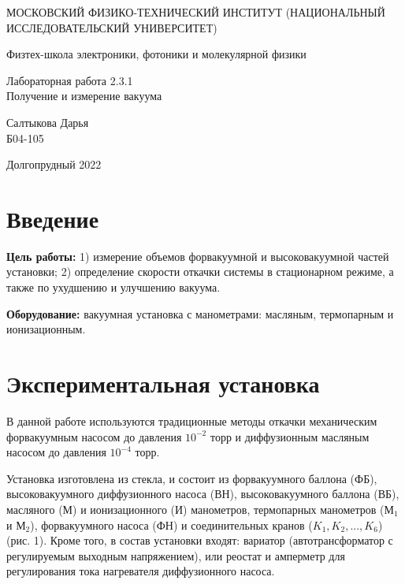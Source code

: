 \documentclass[a4paper,12pt]{article} %
\begin{document}
	
	\begin{titlepage}
	\begin{center}
		{\large МОСКОВСКИЙ ФИЗИКО-ТЕХНИЧЕСКИЙ ИНСТИТУТ (НАЦИОНАЛЬНЫЙ ИССЛЕДОВАТЕЛЬСКИЙ УНИВЕРСИТЕТ)}
	\end{center}
	\begin{center}
		{\large Физтех-школа электроники, фотоники и молекулярной физики}
	\end{center}
	
	
	\vspace{4.5cm}
	{\huge
		\begin{center}
			{Лабораторная работа 2.3.1}\\
			Получение и измерение вакуума
		\end{center}
	}
	\vspace{2cm}
	\begin{flushright}
		{\LARGE Салтыкова Дарья \\
			\vspace{0.5cm}
			Б04-105}
	\end{flushright}
	\vspace{8cm}
	\begin{center}
		Долгопрудный 2022
	\end{center}
\end{titlepage}

\section{Введение}

\noindent
\textbf{Цель работы:} 1) измерение объемов форвакуумной и высоковакуумной частей установки; 2) определение скорости откачки системы в стационарном режиме, а также по ухудшению и улучшению вакуума.
\medskip

\noindent \textbf{Оборудование:} вакуумная установка с манометрами: масляным, термопарным и ионизационным.

\section{Экспериментальная установка}

\noindent В данной работе используются традиционные методы откачки механическим форвакуумным насосом до давления $10^{-2}$ торр и диффузионным масляным насосом до давления $10^{-4}$ торр.

\medskip

\noindent Установка изготовлена из стекла,
 и состоит из форвакуумного баллона (ФБ), высоковакуумного диффузионного насоса (ВН), высоковакуумного баллона (ВБ), масляного (М) и ионизационного (И) манометров, термопарных манометров ($\text{М}_1$ и $\text{М}_2$), форвакуумного насоса (ФН) и соединительных кранов ($K_1, K_2,..., K_6$) (рис. 1). Кроме того, в состав установки входят: вариатор
 (автотрансформатор с регулируемым выходным напряжением), или
 реостат и амперметр для регулирования тока нагревателя диффузионного насоса. 
 
\end{document}
